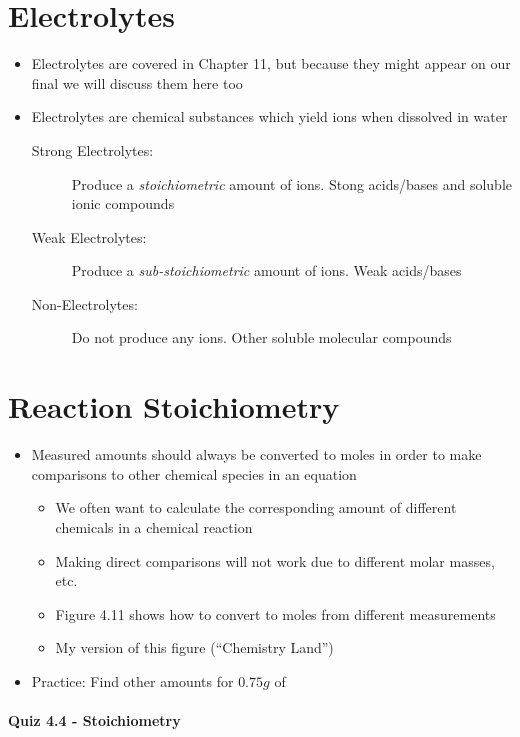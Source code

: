 \documentclass[12pt, openany, letterpaper]{memoir}
\begin{document}
\section*{Electrolytes}
\begin{itemize}
  \item Electrolytes are covered in Chapter 11, but because they might appear on our final we will discuss them here too
  \item Electrolytes are chemical substances which yield ions when dissolved in water
    \begin{description}
      \item[Strong Electrolytes: ] Produce a \emph{stoichiometric} amount of ions. Stong acids/bases and soluble ionic compounds
      \item[Weak Electrolytes: ] Produce a \emph{sub-stoichiometric} amount of ions. Weak acids/bases
      \item[Non-Electrolytes: ] Do not produce any ions. Other soluble molecular compounds
    \end{description}
\end{itemize}

\section{Reaction Stoichiometry}
\begin{itemize}
  \item Measured amounts should always be converted to moles in order to make comparisons to other chemical species in an equation
    \begin{itemize}
      \item We often want to calculate the corresponding amount of different chemicals in a chemical reaction
      \item Making direct comparisons will not work due to different molar masses, etc.
      \item Figure 4.11 shows how to convert to moles from different measurements
      \item My version of this figure (``Chemistry Land'')
    \end{itemize}
  \item Practice:  Find other amounts for $0.75g$ of 
\end{itemize}

\paragraph*{Quiz 4.4 - Stoichiometry}
\end{document}
